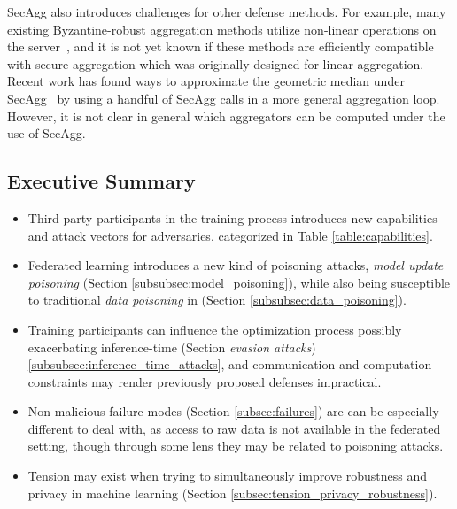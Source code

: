 SecAgg also introduces challenges for other defense methods. For example, many existing Byzantine-robust aggregation methods utilize non-linear operations on the server~\citet{xie2019practicalsecure}, and it is not yet known if these methods are efficiently compatible with secure aggregation which was originally designed for linear aggregation. Recent work has found ways to approximate the geometric median under SecAgg~\citep{pillutla2019robust} by using a handful of SecAgg calls in a more general aggregation loop. However, it is not clear in general which aggregators can be computed under the use of SecAgg.

\subsection{Executive Summary}
\label{subsec:attacks_and_failures_summary}

% 

\begin{itemize}
    \item Third-party participants in the training process introduces new capabilities and attack vectors for adversaries, categorized in Table \ref{table:capabilities}.
    \item Federated learning introduces a new kind of poisoning attacks, \emph{model update poisoning} (Section \ref{subsubsec:model_poisoning}), while also being susceptible to traditional \emph{data poisoning} in (Section \ref{subsubsec:data_poisoning}).
    \item Training participants can influence the optimization process possibly exacerbating inference-time (Section \emph{evasion attacks}) \ref{subsubsec:inference_time_attacks}, and communication and computation constraints may render previously proposed defenses impractical.
    \item Non-malicious failure modes (Section \ref{subsec:failures}) are can be especially different to deal with, as access to raw data is not available in the federated setting, though through some lens they may be related to poisoning attacks.
    \item Tension may exist when trying to simultaneously improve robustness and privacy in machine learning (Section \ref{subsec:tension_privacy_robustness}).
\end{itemize}

